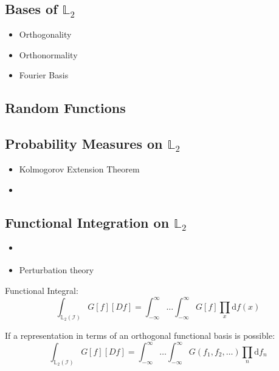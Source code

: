 \documentclass[11pt,twoside,a4paper]{article}
\theoremstyle{MAstyle} \newtheorem{assumption}{Assumption}
\theoremstyle{MAstyle} \newtheorem{definition}{Definition}
\begin{document}
		\subsection{Bases of $\mathbb{L}_2$}
			\begin{itemize}
				\item Orthogonality
				\item Orthonormality
				\item Fourier Basis
			\end{itemize}
	
		\subsection{Random Functions}
		
		\subsection{Probability Measures on $\mathbb{L}_2$}
			\begin{itemize}
				\item Kolmogorov Extension Theorem
				\item \cite{gihman_theory_2004}
			\end{itemize}
		
		\subsection{Functional Integration on $\mathbb{L}_2$}
			\begin{itemize}
				\item \cite{skorohod_integration_1974}
				\item Perturbation theory
			\end{itemize}
		
			Functional Integral:
			\begin{equation}
				\int_{\mathbb{L}_2(\mathcal{I})} G\left[f\right] \left[Df\right] = \int_{-\infty}^{\infty}\dots\int_{-\infty}^{\infty} G\left[f\right] \prod_{x} \mathrm{d}f(x)
			\end{equation}
		
			If a representation in terms of an orthogonal functional basis is possible:
			\begin{equation}
				\int_{\mathbb{L}_2(\mathcal{I})} G\left[f\right] \left[Df\right] = \int_{-\infty}^{\infty}\dots\int_{-\infty}^{\infty} G\left(f_1, f_2, \dots\right) \prod_{n} \mathrm{d}f_n
			\end{equation}
		
\end{document}
